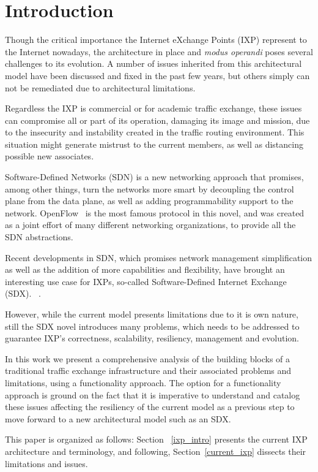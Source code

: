 \documentclass[conference]{IEEEtran/IEEEtran}
\begin{document}
\section{Introduction}
\label{introduction}
Though the critical importance the Internet eXchange Points (IXP) represent to the Internet nowadays, the architecture in place and \textit{modus operandi} poses several challenges to its evolution. A number of issues inherited from this architectural model have been discussed and fixed in the past few years, but others simply can not be remediated due to architectural limitations. 

Regardless the IXP is commercial or for academic traffic exchange, these issues can compromise all or part of its operation, damaging its image and mission, due to the insecurity and instability created in the traffic routing environment. This situation might generate mistrust to the current members, as well as distancing possible new associates.

Software-Defined Networks (SDN) is a new networking approach that promises, among other things, turn the networks more smart by decoupling the control plane from the data plane, as well as adding programmability support to the network. OpenFlow~\cite{mckeown2008openflow} is the most famous protocol in this novel, and was created as a joint effort of many different networking organizations, to provide all the SDN abstractions.

Recent developments in SDN, which promises network management simplification as well as the addition of more capabilities and flexibility, have brought an interesting use case for IXPs, so-called Software-Defined Internet Exchange (SDX). ~\cite{gupta2015sdx}. 

However, while the current model presents limitations due to it is own nature, still the SDX novel introduces many problems, which needs to be addressed to guarantee IXP's correctness, scalability, resiliency, management and evolution.

In this work we present a comprehensive analysis of the building blocks of a traditional traffic exchange infrastructure and their associated problems and limitations, using a functionality approach. The option for a functionality approach is ground on the fact that it is imperative to understand and catalog these issues affecting the resiliency of the current model as a previous step to move forward to a new architectural model such as an SDX. 

This paper is organized as follows: Section ~\ref{ixp_intro} presents the current IXP architecture and terminology, and following, Section~\ref{current_ixp} dissects their limitations and issues.
\end{document}
